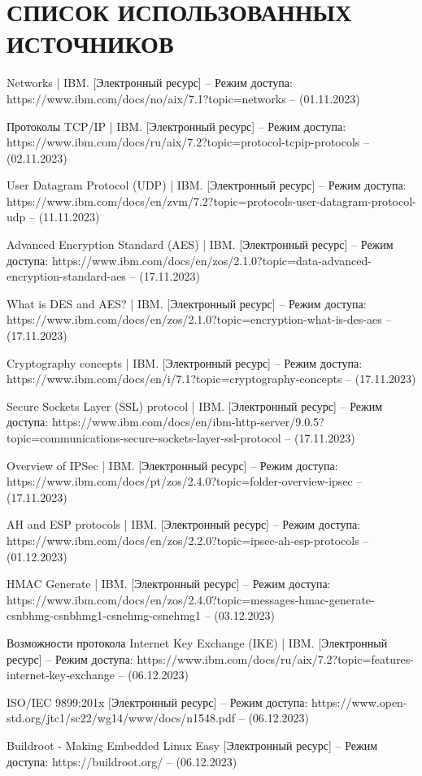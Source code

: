 \section*{СПИСОК ИСПОЛЬЗОВАННЫХ ИСТОЧНИКОВ}

\begingroup
\renewcommand{\section}[2]{}
\begin{thebibliography}{}
	Networks | IBM. [Электронный ресурс] – Режим доступа: https://www.ibm.com/docs/no/aix/7.1?topic=networks – (01.11.2023)
	
	Протоколы TCP/IP | IBM. [Электронный ресурс] – Режим доступа: https://www.ibm.com/docs/ru/aix/7.2?topic=protocol-tcpip-protocols – (02.11.2023)
	
	User Datagram Protocol (UDP) | IBM. [Электронный ресурс] – Режим доступа: 	https://www.ibm.com/docs/en/zvm/7.2?topic=protocols-user-datagram-protocol-udp – (11.11.2023)
	
	Advanced Encryption Standard (AES) | IBM. [Электронный ресурс] – Режим доступа: 	https://www.ibm.com/docs/en/zos/2.1.0?topic=data-advanced-encryption-standard-aes – (17.11.2023)
	
	What is DES and AES? | IBM. [Электронный ресурс] – Режим доступа: 	https://www.ibm.com/docs/en/zos/2.1.0?topic=encryption-what-is-des-aes – (17.11.2023)
	
	Cryptography concepts | IBM. [Электронный ресурс] – Режим доступа: 	https://www.ibm.com/docs/en/i/7.1?topic=cryptography-concepts – (17.11.2023)
	
	Secure Sockets Layer (SSL) protocol | IBM. [Электронный ресурс] – Режим доступа: 	https://www.ibm.com/docs/en/ibm-http-server/9.0.5?topic=communications-secure-sockets-layer-ssl-protocol – (17.11.2023)
	
	Overview of IPSec | IBM. [Электронный ресурс] – Режим доступа: 	https://www.ibm.com/docs/pt/zos/2.4.0?topic=folder-overview-ipsec – (17.11.2023)
	
	AH and ESP protocols | IBM. [Электронный ресурс] – Режим доступа: 	https://www.ibm.com/docs/en/zos/2.2.0?topic=ipsec-ah-esp-protocols – (01.12.2023)
	
	HMAC Generate | IBM. [Электронный ресурс] – Режим доступа: 	https://www.ibm.com/docs/en/zos/2.4.0?topic=messages-hmac-generate-csnbhmg-csnbhmg1-csnehmg-csnehmg1 – (03.12.2023)
	
	Возможности протокола Internet Key Exchange (IKE) | IBM. [Электронный ресурс] – Режим доступа: 	https://www.ibm.com/docs/ru/aix/7.2?topic=features-internet-key-exchange – (06.12.2023)
	
	ISO/IEC 9899:201x [Электронный ресурс] – Режим доступа: 	https://www.open-std.org/jtc1/sc22/wg14/www/docs/n1548.pdf – (06.12.2023)
	
	Buildroot - Making Embedded Linux Easy [Электронный ресурс] – Режим доступа: 	https://buildroot.org/ – (06.12.2023)
\end{thebibliography}
\endgroup

\pagebreak